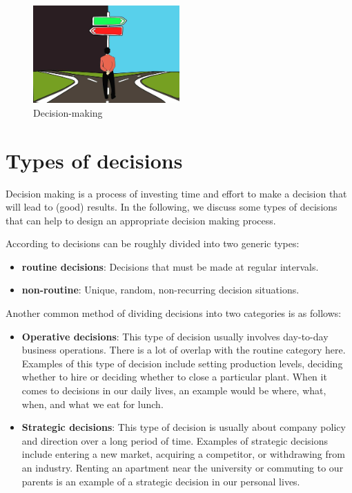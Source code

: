 \documentclass[
  12pt,
  oneside]{book}
\providecommand{\tightlist}{%
  \setlength{\itemsep}{0pt}\setlength{\parskip}{0pt}}
\theoremstyle{definition}
\theoremstyle{definition}
\theoremstyle{definition}
\theoremstyle{definition}
\theoremstyle{remark}
\begin{document}
\begin{figure}
\centering
\includegraphics[width=0.5\textwidth,height=\textheight]{fig/decision-making.jpg}
\caption[\label{fig:decisionm} Decision-making]{\label{fig:decisionm} Decision-making\footnotemark{}}
\end{figure}

\hypertarget{types-of-decisions}{%
\section{Types of decisions}\label{types-of-decisions}}

Decision making is a process of investing time and effort to make a decision that will lead to (good) results. In the following, we discuss some types of decisions that can help to design an appropriate decision making process.

According to \citet[p.~9f]{Fitzgerald2002Decision} decisions can be roughly divided into two generic types:

\begin{itemize}
\tightlist
\item
  \textbf{routine decisions}: Decisions that must be made at regular intervals.
\item
  \textbf{non-routine}: Unique, random, non-recurring decision situations.
\end{itemize}

Another common method of dividing decisions into two categories is as follows:

\begin{itemize}
\tightlist
\item
  \textbf{Operative decisions}: This type of decision usually involves day-to-day business operations. There is a lot of overlap with the routine category here. Examples of this type of decision include setting production levels, deciding whether to hire or deciding whether to close a particular plant. When it comes to decisions in our daily lives, an example would be where, what, when, and what we eat for lunch.
\item
  \textbf{Strategic decisions}: This type of decision is usually about company policy and direction over a long period of time. Examples of strategic decisions include entering a new market, acquiring a competitor, or withdrawing from an industry. Renting an apartment near the university or commuting to our parents is an example of a strategic decision in our personal lives.
\end{itemize}
\end{document}
